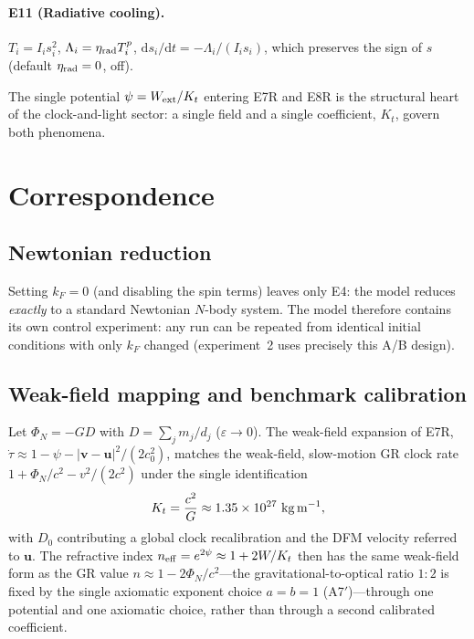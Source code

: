 \documentclass[aps,reprint,amsmath,amssymb,nofootinbib,superscriptaddress,floatfix]{revtex4-2}
\newcommand{\ud}{\mathrm{d}}
\newcommand{\vect}[1]{\bm{#1}}
\newcommand{\Kt}{K_t}
\newcommand{\Dz}{D_0}
\begin{document}
\paragraph*{E11 (Radiative cooling).}
$T_i = I_i s_i^2$, $\Lambda_i = \eta_{\rm rad}T_i^p$,
$\ud s_i/\ud t = -\Lambda_i/(I_i s_i)$, which preserves the sign of
$s$ (default $\eta_{\rm rad} = 0$, off).

The single potential $\psi = W_{\rm ext}/\Kt$ entering E7R and E8R is
the structural heart of the clock-and-light sector: a single field and
a single coefficient, $\Kt$, govern both phenomena.

\section{Correspondence}
\label{sec:corr}

\subsection{Newtonian reduction}
\label{sec:newton}

Setting $k_F = 0$ (and disabling the spin terms) leaves only E4: the
model reduces \emph{exactly} to a standard Newtonian $N$-body system.
The model therefore contains its own control experiment: any run can be
repeated from identical initial conditions with only $k_F$ changed
(experiment~2 uses precisely this A/B design).

\subsection{Weak-field mapping and benchmark calibration}
\label{sec:calib}

Let $\Phi_N = -G D$ with $D = \sum_j m_j/d_j$ ($\varepsilon\to0$).
The weak-field expansion of E7R,
$\dot\tau \approx 1 - \psi - |\vect{v}-\vect{u}|^2/(2c_0^2)$,
matches the weak-field, slow-motion GR clock rate
$1 + \Phi_N/c^2 - v^2/(2c^2)$ under the single identification
\begin{equation}
\Kt = \frac{c^2}{G} \approx 1.35\times10^{27}\ {\rm kg\,m^{-1}},
\label{eq:Kt}
\end{equation}
with $\Dz$ contributing a global clock recalibration and the DFM
velocity referred to $\vect{u}$.
The refractive index $n_{\rm eff} = e^{2\psi} \approx 1 + 2W/\Kt$ then
has the same weak-field form as the GR value
$n \approx 1 - 2\Phi_N/c^2$---the gravitational-to-optical ratio
$1{:}2$ is fixed by the single axiomatic exponent choice $a = b = 1$
(A7$'$)---through one potential and one axiomatic choice, rather than
through a second calibrated coefficient.
\end{document}
